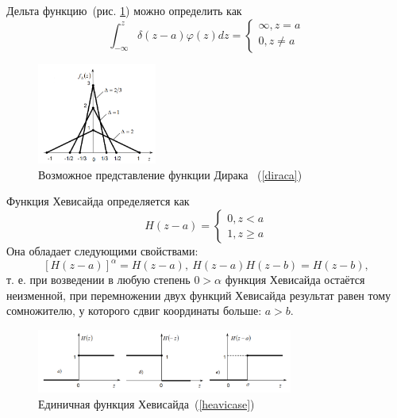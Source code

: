 \documentclass[12pt, a4paper]{article}
\begin{document}
Дельта функцию~(рис. \ref{dirac}) можно определить как 
\begin{equation}
	\label{diraca}
	\int_{-\infty}^z \delta (z - a) \varphi (z) dz = 
		\begin{cases}
			\infty, z = a \\
			0, z \neq a	
		\end{cases}
\end{equation}
\begin{figure}[!h]
	\centering
	\includegraphics[width=0.35\textwidth]{dirac}%
	\caption{Возможное представление функции Дирака ~(\ref{diraca})}
	\vspace*{-2mm}
	\label{dirac}
\end{figure}

Функция Хевисайда определяется как
\begin{equation}
	\label{heavicase}
	H(z - a) = 
	\begin{cases}
		0, z < a \\
		1, z \geqslant a	
	\end{cases}
\end{equation}
Она обладает следующими свойствами:
\begin{equation}
	\label{heavicase}
	[H(z - a)]^\alpha = H(z - a),~
	H(z - a) H(z - b) = H(z - b),	
\end{equation}
т. е. при возведении в любую степень $0 > \alpha$ функция Хевисайда остаётся
неизменной, при перемножении двух функций Хевисайда результат равен
тому сомножителю, у которого сдвиг координаты больше: $a > b$.

\begin{figure}[!h]
	\centering
	\includegraphics[width=0.75\textwidth]{heavi}%
	\caption{Единичная функция Хевисайда~(\ref{heavicase})}
	\vspace*{-2mm}
	\label{heavi}
\end{figure}
\end{document}
